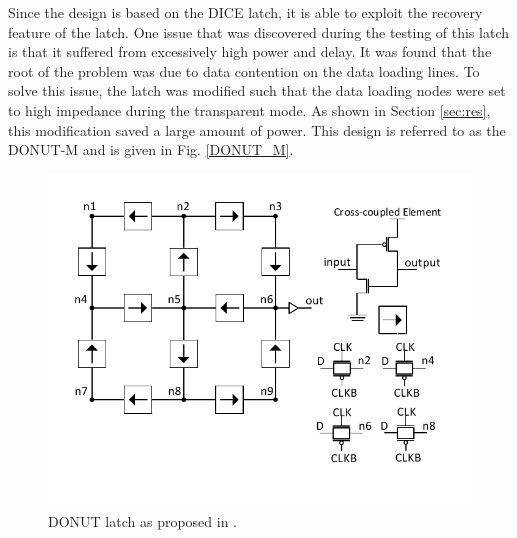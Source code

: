 Since the design is based on the DICE latch, it is able to exploit the recovery feature of the latch. One issue that was discovered during the testing of this latch is that it suffered from excessively high power and delay. It was found that the root of the problem was due to data contention on the data loading lines. To solve this issue, the latch was modified such that the data loading nodes were set to high impedance during the transparent mode. As shown in Section \ref{sec:res}, this modification saved a large amount of power. This design is referred to as the DONUT-M and is given in Fig. \ref{DONUT_M}.

\begin{figure}[!htbp]
	\centering
	\includegraphics[width=\linewidth]{Figures/DONUT}
	\caption{DONUT latch as proposed in \cite{DONUT}.}
	\label{fig:DONUT}
\end{figure}

